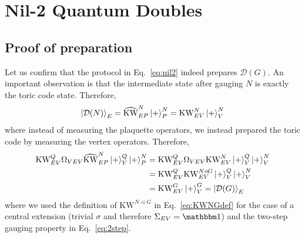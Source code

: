 \documentclass[nofootinbib,prx,twocolumn,showpacs,superscriptaddress,notitlepage,amsmath,amssymb]{revtex4-2}
\theoremstyle{definition}
\def\KW{\text{KW}}
\def\KWd{\widehat{\text{KW}}}
\def\ket#1{\mathinner{|{#1}\rangle}}
\begin{document}
\section{Nil-2 Quantum Doubles}\label{app:nil2}

\subsection{Proof of preparation}\label{app:nil2prepproof}
Let us confirm that the protocol in Eq.~\eqref{eq:nil2} indeed prepares $\mathcal D(G)$. An important observation is that the intermediate state after gauging $N$ is exactly the toric code state. Therefore,
\begin{align}
    \ket{\mathcal D(N)}_E =\KWd_{EP}^N\ket{+}^N_P = \KW_{EV}^N\ket{+}^N_V
\end{align}
where instead of measuring the plaquette operators, we instead prepared the toric code by measuring the vertex operators. Therefore,
\begin{align}
\KW^Q_{EV}\Omega_{VEV} \KWd^N_{EP}\ket{+}^Q_V \ket{+}^N_P &=  \KW^Q_{EV}\Omega_{VEV}\KW_{EV}^N\ket{+}^Q_V \ket{+}^N_V \\
&= \KW^Q_{EV}\KW_{EV}^{N\triangleleft G} \ket{+}^Q_V \ket{+}^N_V \\
&= \KW^G_{EV} \ket{+}^G_V  = \ket{\mathcal D(G)}_E
\end{align}
where we used the definition of $\KW^{N \triangleleft G}$ in Eq.~\eqref{eq:KWNGdef} for the case of a central extension (trivial $\sigma$ and therefore $\Sigma_{EV} = \mathbbm 1$) and the two-step gauging property in Eq.~\eqref{eq:2step}.
\end{document}
